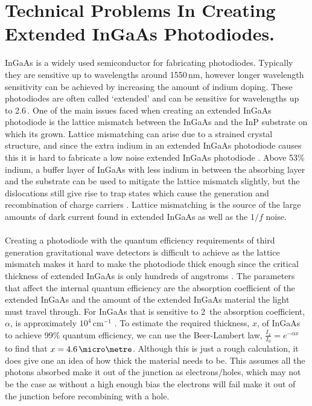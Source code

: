 \section{Technical Problems In Creating Extended InGaAs Photodiodes.}
InGaAs is a widely used semiconductor for fabricating photodiodes. Typically they are sensitive up to wavelengths around 1550\,nm, however longer wavelength sensitivity can be achieved by increasing the amount of indium doping. These photodiodes are often called `extended' and can be sensitive for wavelengths up to 2.6\,\SIunits{\micro \metre}. One of the main issues faced when creating an extended InGaAs photodiode is the lattice mismatch between the InGaAs and the InP substrate on which its grown. Lattice mismatching can arise due to a strained crystal structure, and since the extra indium in an extended InGaAs photodiode causes this \cite{Gendry1992} it is hard to fabricate a low noise extended InGaAs photodiode \cite{Martinelli1988}. Above 53\% indium, a buffer layer of InGaAs with less indium in between the absorbing layer and the substrate can be used to mitigate the lattice mismatch slightly, but the dislocations still give rise to trap states which cause the generation and recombination of charge carriers \cite{Zimmermann2003}. Lattice mismatching is the source of the large amounts of dark current found in extended InGaAs as well as the $1/f$ noise.
\paragraph{}
Creating a photodiode with the quantum efficiency requirements of third generation gravitational wave detectors is difficult to achieve as the lattice mismatch makes it hard to make the photodiode thick enough since the critical thickness of extended InGaAs is only hundreds of angstroms \cite{Gendry1992}. The parameters that affect the internal quantum efficiency are the absorption coefficient of the extended InGaAs and the amount of the extended InGaAs material the light must travel through. For InGaAs that is sensitive to 2\,\SIunits{\micro\metre} the absorption coefficient, $\alpha$, is approximately $10^4$\,cm$^{-1}$ \cite{Alam2007}. To estimate the required thickness, $x$, of InGaAs to achieve 99\% quantum efficiency, we can use the Beer-Lambert law, $\frac{I_x}{I_0} = e^{-\alpha x}\label{eq:absorbtion}$ to find that $x = 4.6\,\micro\metre$. Although this is just a rough calculation, it does give one an idea of how thick the material needs to be. This assumes all the photons absorbed make it out of the junction as electrons/holes, which may not be the case as without a high enough bias the electrons will fail make it out of the junction before recombining with a hole. 
